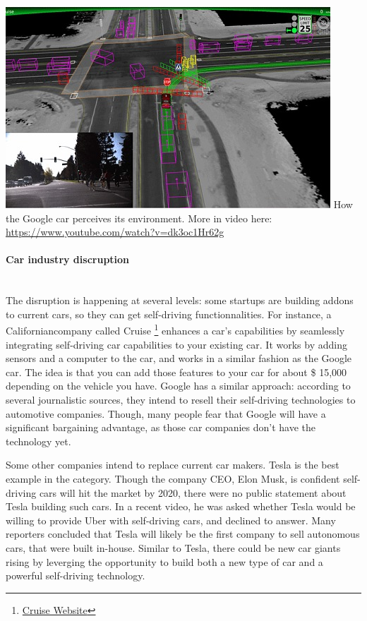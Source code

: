 \documentclass[12pt]{article}
\begin{document}
\vspace{5mm}
\includegraphics[width=\textwidth]{google-car}
How the Google car perceives its environment. More in video here: \url{https://www.youtube.com/watch?v=dk3oc1Hr62g}
\vspace{5mm}

\paragraph{Car industry discruption}
\\
The disruption is happening at several levels: some startups are building addons
to current cars, so they can get self-driving functionnalities. For instance,
a Californiancompany called Cruise
\footnote{\href{http://www.getcruise.com}{Cruise Website}}
enhances a car's capabilities by seamlessly integrating self-driving car
capabilities to your existing car. It works by adding sensors and a computer to
the car, and works in a similar fashion as the Google car. The idea is that you
can add those features to your car for about \$ 15,000 depending on the vehicle
you have. Google has a similar approach: according to several journalistic
sources, they intend to resell their self-driving technologies to automotive
companies. Though, many people fear that Google will have a significant
bargaining advantage, as those car companies don't have the technology yet.

Some other companies intend to replace current car makers. Tesla is the best
example in the category. Though the company CEO, Elon Musk, is confident
self-driving cars will hit the market by 2020, there were no public statement
about Tesla building such cars. In a recent video, he was asked whether Tesla
would be willing to provide Uber with self-driving cars, and declined to answer.
Many reporters concluded that Tesla will likely be the first company to sell
autonomous cars, that were built in-house. Similar to Tesla, there could be new
car giants rising by leverging the opportunity to build both a new type of car
and a powerful self-driving technology.
\end{document}

